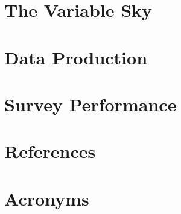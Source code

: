 \documentclass[SE,lsstdraft,authoryear,toc]{lsstdoc}
\begin{document}


\section{The Variable Sky}





\section{Data Production}



\section{Survey Performance} \label{sec:survey_performance}







\appendix
\section{References} \label{sec:bib}
\renewcommand{\refname}{} %


\section{Acronyms} \label{sec:acronyms}

\end{document}
